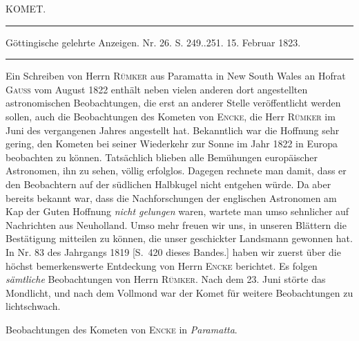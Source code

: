 \clearpage
{}
\begin{center}
{\large KOMET.}

\noindent\rule{\linewidth}{0.4pt}

Göttingische gelehrte Anzeigen. Nr. 26. S. 249..251. 15. Februar 1823.

\noindent\rule{\linewidth}{0.4pt}
\end{center}

Ein Schreiben von Herrn \textsc{Rümker} aus Paramatta in New South Wales an Hofrat \textsc{Gauss} vom August 1822 enthält neben vielen anderen dort angestellten astronomischen Beobachtungen, die erst an anderer Stelle veröffentlicht werden sollen, auch die Beobachtungen des Kometen von \textsc{Encke}, die Herr \textsc{Rümker} im Juni des vergangenen Jahres angestellt hat. Bekanntlich war die Hoffnung sehr gering, den Kometen bei seiner Wiederkehr zur Sonne im Jahr 1822 in Europa beobachten zu können. Tatsächlich blieben alle Bemühungen europäischer Astronomen, ihn zu sehen, völlig erfolglos. Dagegen rechnete man damit, dass er den Beobachtern auf der südlichen Halbkugel nicht entgehen würde. Da aber bereits bekannt war, dass die Nachforschungen der englischen Astronomen am Kap der Guten Hoffnung \emph{nicht gelungen} waren, wartete man umso sehnlicher auf Nachrichten aus Neuholland. Umso mehr freuen wir uns, in unseren Blättern die Bestätigung mitteilen zu können, die unser geschickter Landsmann gewonnen hat. In Nr. 83 des Jahrgangs 1819 [S.~420 dieses Bandes.] haben wir zuerst über die höchst bemerkenswerte Entdeckung von Herrn \textsc{Encke} berichtet. Es folgen \emph{sämtliche} Beobachtungen von Herrn \textsc{Rümker}. Nach dem 23. Juni störte das Mondlicht, und nach dem Vollmond war der Komet für weitere Beobachtungen zu lichtschwach.

\begin{center}
Beobachtungen des Kometen von \textsc{Encke} in \emph{Paramatta}.
\end{center}

